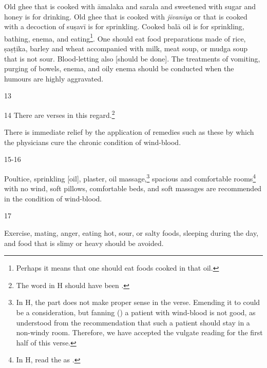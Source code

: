 \begin{translation}
    Old ghee that is cooked with \gls{āmalaka} and \gls{sarala} and sweetened with sugar and honey is for drinking. Old ghee that is cooked with \textit{jīvanīya} or that is cooked with a decoction of \gls{suṣavī} is for sprinkling. Cooked \gls{balā} oil is for sprinkling, bathing, enema, and eating\footnote{Perhaps it means that one should eat foods cooked in that oil.}. One should eat food preparations made of rice, \gls{ṣaṣṭika}, barley and wheat accompanied with milk, meat soup, or \gls{mudga} soup that is not sour. Blood-letting also [should be done]. The treatments of vomiting, purging of bowels, enema, and oily enema should be conducted when the humours are highly aggravated.

    \item[13] 

    \item[14] There are verses in this regard.\footnote{The word  in H should have been .}
    \begin{sloka}
    There is immediate relief by the application of remedies such as these by which the physicians cure the chronic condition of wind-blood. 
    \end{sloka}

    \item[15-16]
    \begin{sloka}
    Poultice, sprinkling [oil], plaster, oil massage,\footnote{In H, the part  does not make proper sense in the verse. Emending it to  could be a consideration, but fanning () a patient with wind-blood is not good, as understood from the recommendation that such a patient should stay in a non-windy room. Therefore, we have accepted the vulgate reading for the first half of this verse.} spacious and comfortable rooms\footnote{In H, read the   as .} with no wind, soft pillows, comfortable beds, and soft massages are recommended in the condition of wind-blood.
    \end{sloka}

    \item[17]
    \begin{sloka}
     Exercise, mating, anger, eating hot, sour, or salty foods, sleeping during the day, and food that is slimy or heavy should be avoided.
\end{sloka}


\end{translation}
